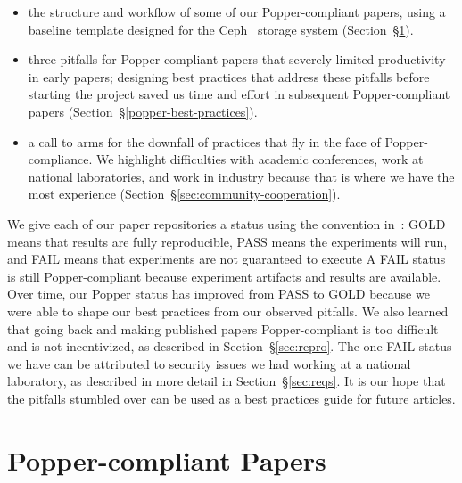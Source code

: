 \begin{itemize}

  \item the structure and workflow of some of our Popper-compliant papers,
using a baseline template designed for the Ceph~\cite{weil:osdi2006-ceph}
storage system (Section~\S\ref{sec:popper-compliant-papers}).

  \item three pitfalls for Popper-compliant papers that severely limited
productivity in early papers; designing best practices that address these
pitfalls before starting the project saved us time and effort in subsequent
Popper-compliant papers (Section~\S\ref{popper-best-practices}).

  \item a call to arms for the downfall of practices that fly in the face of
Popper-compliance. We highlight difficulties with academic conferences, work at
national laboratories, and work in industry because that is where we have the
most experience (Section~\S\ref{sec:community-cooperation}).

\end{itemize}

We give each of our paper repositories a status using the convention
in~\cite{jimenez:rr18-popper}: GOLD means that results are fully reproducible,
PASS means the experiments will run, and FAIL means that experiments are not
guaranteed to execute A FAIL status is still Popper-compliant because
experiment artifacts and results are available.  Over time, our Popper status
has improved from PASS to GOLD because we were able to shape our best practices
from our observed pitfalls. We also learned that going back and making
published papers Popper-compliant is too difficult and is not incentivized, as
described in Section~\S\ref{sec:repro}. The one FAIL status we have can be
attributed to security issues we had working at a national laboratory, as
described in more detail in Section~\S\ref{sec:reqs}. It is our hope that the
pitfalls stumbled over can be used as a best practices guide for future
articles.

\section{Popper-compliant Papers}
\label{sec:popper-compliant-papers}

